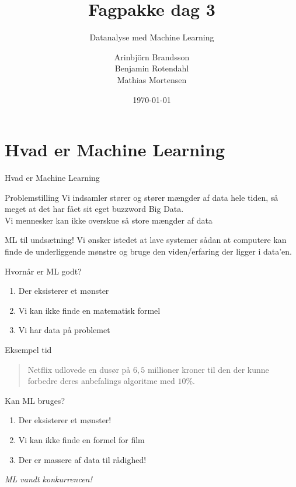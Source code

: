 \documentclass[12pt,t]{beamer}
\title{Fagpakke dag 3}
\subtitle{Datanalyse med Machine Learning}
\author{
        Arinbjörn Brandsson \\
        Benjamin Rotendahl  \\
        Mathias Mortensen
}
\date[]{\today}
\begin{document}
\frame[plain]{\titlepage}
 \frame{\tableofcontents}

 \section{Hvad er Machine Learning}
     \begin{frame}[t]{Hvad er Machine Learning}
         \begin{block}{Problemstilling}
             Vi indsamler stører og stører mængder af data hele tiden, så meget
             at det har fået sit eget buzzword \alert{Big Data}. \\
             \pause
             Vi mennesker kan ikke overskue så store mængder af data
         \end{block}

         \pause

         \begin{block}{ML til undsætning!}
             Vi ønsker istedet at lave systemer sådan at computere kan finde de
             underliggende mønstre og bruge den viden/erfaring der ligger i
             data'en.
         \end{block}

         \pause

         \begin{block}{Hvornår er ML godt?}
             \begin{enumerate}
                 \item Der eksisterer et mønster \pause
                 \item Vi kan ikke finde en matematisk formel \pause
                 \item Vi har data på problemet
             \end{enumerate}
         \end{block}
     \end{frame}

     \begin{frame}[t]{Eksempel tid}
         \begin{quote}
             Netflix udlovede en dusør på $6,5$ millioner kroner til den der
             kunne forbedre deres anbefalings algoritme med $10\%$.
         \end{quote}

         \pause{}

         \begin{block}{Kan ML bruges?}
             \begin{enumerate}
                 \item Der eksisterer et mønster! \pause
                 \item Vi kan ikke finde en formel for film \pause
                 \item Der er massere af data til rådighed!
             \end{enumerate}
         \end{block}
         \pause{}
         \centering \emph{ML vandt konkurrencen!}
     \end{frame}
\end{document}
